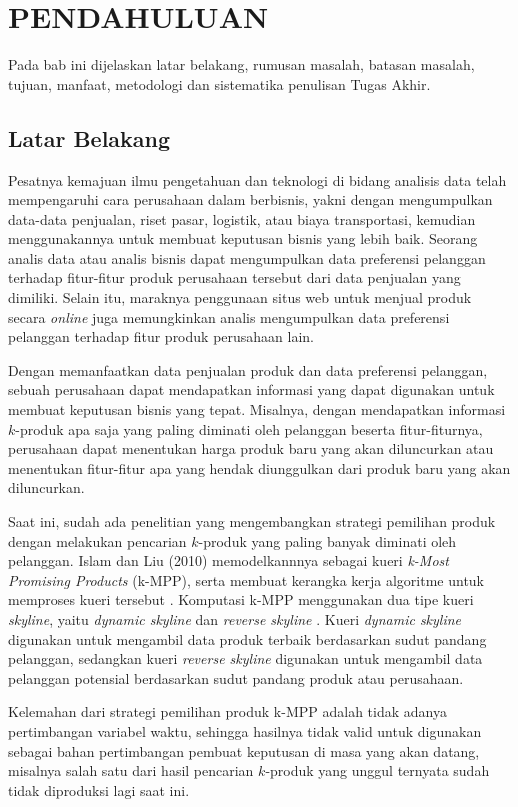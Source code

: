 \chapter{PENDAHULUAN}
\tab Pada bab ini dijelaskan latar belakang, rumusan masalah, batasan masalah, tujuan, manfaat, metodologi dan sistematika penulisan Tugas Akhir.

\section{Latar Belakang}
\tab Pesatnya kemajuan ilmu pengetahuan dan teknologi di bidang analisis data telah mempengaruhi cara perusahaan dalam berbisnis, yakni dengan mengumpulkan data-data penjualan, riset pasar, logistik, atau biaya transportasi, kemudian menggunakannya untuk membuat keputusan bisnis yang lebih baik. Seorang analis data atau analis bisnis dapat mengumpulkan data preferensi pelanggan terhadap fitur-fitur produk perusahaan tersebut dari data penjualan yang dimiliki. Selain itu, maraknya penggunaan situs web untuk menjual produk secara \textit{online} juga memungkinkan analis mengumpulkan data preferensi pelanggan terhadap fitur produk perusahaan lain.

Dengan memanfaatkan data penjualan produk dan data preferensi pelanggan, sebuah perusahaan dapat mendapatkan informasi yang dapat digunakan untuk membuat keputusan bisnis yang tepat. Misalnya, dengan mendapatkan informasi $k$-produk apa saja yang paling diminati oleh pelanggan beserta fitur-fiturnya, perusahaan dapat menentukan harga produk baru yang akan diluncurkan atau menentukan fitur-fitur apa yang hendak diunggulkan dari produk baru yang akan diluncurkan. 

\pagebreak
Saat ini, sudah ada penelitian yang mengembangkan strategi pemilihan produk dengan melakukan pencarian $k$-produk yang paling banyak diminati oleh pelanggan. Islam dan Liu (2010) memodelkannnya sebagai kueri \textit{k-Most Promising Products} (k-MPP), serta membuat kerangka kerja algoritme untuk memproses kueri tersebut \cite{kmpp}. Komputasi k-MPP menggunakan dua tipe kueri \textit{skyline}, yaitu \textit{dynamic skyline} \cite{dynamic-skyline} dan \textit{reverse skyline} \cite{reverse-skyline}. Kueri \textit{dynamic skyline} digunakan untuk mengambil data produk terbaik berdasarkan sudut pandang pelanggan, sedangkan kueri \textit{reverse skyline} digunakan untuk mengambil data pelanggan potensial berdasarkan sudut pandang produk atau perusahaan.

Kelemahan dari strategi pemilihan produk k-MPP adalah tidak adanya pertimbangan variabel waktu, sehingga hasilnya tidak valid untuk digunakan sebagai bahan pertimbangan pembuat keputusan di masa yang akan datang, misalnya salah satu dari hasil pencarian $k$-produk yang unggul ternyata sudah tidak diproduksi lagi saat ini. 

